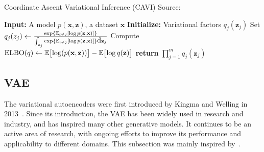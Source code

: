 \begin{algorithm}
    \caption[CAVI algorithm]{Coordinate Ascent Variational Inference (CAVI) Source: \cite{intro-variational-blog-2019}}
    \label{alg:cavi}
    \begin{algorithmic}[1]
      \State \textbf{Input:} A model $p(\mathbf{x},\mathbf{z})$, a dataset $\mathbf{x}$
      \State \textbf{Initialize:} Variational factors $q_j(\mathbf{z}_j)$
          \State Set $q_j(z_j) \gets \frac{\exp{\operatorname{\mathbb{E}}_{i \neq j} [\log p(\mathbf{z},\mathbf{x})]}}{\int_{\mathbf{z}_j}\exp{\operatorname{\mathbb{E}}_{i \neq j} [\log p(\mathbf{z},\mathbf{x})]}\mbox{\rm d}\mathbf{z}_j}$
        \EndFor
        \State Compute $\mathrm{ELBO}(q) \gets \operatorname{\mathbb{E}} \bigl[\log(p(\mathbf{x},\mathbf{z}))\bigr] - \operatorname{\mathbb{E}} \bigl[ \log q(\mathbf{z}) \bigr]$
      \EndWhile
      \State \textbf{return} $\prod_{j=1}^m q_j(\mathbf{z}_j)$
    \end{algorithmic}
\end{algorithm}

\subsection{VAE}
\label{subsec:vaes}
The variational autoencoders were first introduced by Kingma and Welling in 2013~\cite{vae-original-2013}. Since its introduction, the VAE 
has been widely used in research and industry, and has inspired many other generative models. It continues to be an active area of research, with 
ongoing efforts to improve its performance and applicability to different domains. This subsection was mainly inspired by~\cite{intro-vae-2019}.

